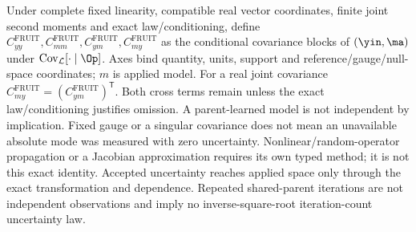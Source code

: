 {{Under complete fixed linearity, compatible real vector coordinates, finite
joint second moments and exact law/conditioning, define $C_{yy}^{\mathrm{FRUIT}},
C_{mm}^{\mathrm{FRUIT}},C_{ym}^{\mathrm{FRUIT}},C_{my}^{\mathrm{FRUIT}}$ as the
conditional covariance blocks of $(\yin,\ma)$ under
$\operatorname{Cov}_{\mathcal L}[\cdot\mid\Op]$. Axes bind quantity, units,
support and reference/gauge/null-space coordinates; $m$ is applied model.
\EqCovariance
For a real joint covariance $C_{my}^{\mathrm{FRUIT}}=(C_{ym}^{\mathrm{FRUIT}})^{\mathsf T}$.
Both cross terms remain unless the exact law/conditioning justifies omission.
A parent-learned model is not independent by implication. Fixed gauge or a
singular covariance does not mean an unavailable absolute mode was measured
with zero uncertainty. Nonlinear/random-operator propagation or a Jacobian
approximation requires its own typed method; it is not this exact identity.
Accepted uncertainty reaches applied space only through the exact transformation
and dependence. Repeated shared-parent iterations are not independent observations
and imply no inverse-square-root iteration-count uncertainty law.
}}

